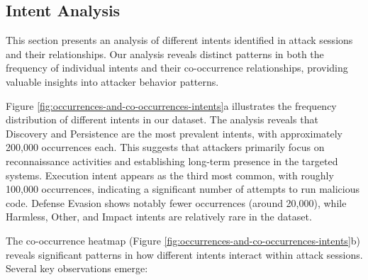     \vspace{-0.3cm}

    \subsection{Intent Analysis}
    
        This section presents an analysis of different intents identified in attack sessions and their relationships. Our analysis reveals distinct patterns in both the frequency of individual intents and their co-occurrence relationships, providing valuable insights into attacker behavior patterns.

        Figure \ref{fig:occurrences-and-co-occurrences-intents}a illustrates the frequency distribution of different intents in our dataset. The analysis reveals that Discovery and Persistence are the most prevalent intents, with approximately 200,000 occurrences each. This suggests that attackers primarily focus on reconnaissance activities and establishing long-term presence in the targeted systems. Execution intent appears as the third most common, with roughly 100,000 occurrences, indicating a significant number of attempts to run malicious code. Defense Evasion shows notably fewer occurrences (around 20,000), while Harmless, Other, and Impact intents are relatively rare in the dataset.

        The co-occurrence heatmap (Figure \ref{fig:occurrences-and-co-occurrences-intents}b) reveals significant patterns in how different intents interact within attack sessions. Several key observations emerge:

